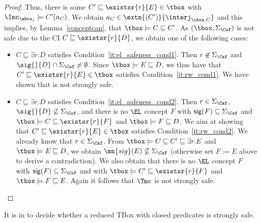 \documentclass{lmcs}
\theoremstyle{definition}
\begin{document}
\begin{proof}
Thus, there is some $C'\sqsubseteq \existsr{r}{E}\in\tbox$ with $\Imc_{\abox_j}\models C'(a_{C})$. 
We obtain $a_{C}\in\extn{(C')}{\interj_{\tbox,C}}$ and this implies, by Lemma~\ref{conceptcan},
that $\tbox\models C\sqsubseteq C'$. 
As $(\tbox,\Sigma_{\Csf})$ is not safe due to the CI
$C\sqsubseteq\existsr{r}{D}$, we obtain one of the following cases:
\begin{itemize}
\item $C \sqsubseteq \exists r . D$ satisfies
  Condition~\ref{it:el_safeness_cond1}.
  Then $r\not\in\Sigma_\Csf$ and $\sig{}{D}\cap\Sigma_\Csf\neq\emptyset$.  Since
  $\tbox\models E\sqsubseteq D$, we thus have that $C'\sqsubseteq
  \existsr{r}{E}\in\tbox$ satisfies Condition~\ref{it:rw_cond1}. We have shown that \Tmc is not strongly safe.

\item  $C \sqsubseteq \exists r . D$ satisfies
  Condition~\ref{it:el_safeness_cond2}.
  Then $r\in\Sigma_\Csf$, $\sig{}{D}\not\subseteq\Sigma_\Csf$, and there is no  $\EL$ concept $F$ with ${\sf sig}(F)\subseteq \Sigma_\Csf$ and
  $\tbox\models C\sqsubseteq\existsr{r}{F}$ and $\tbox\models F\sqsubseteq D$.
  We aim at showing that $C'\sqsubseteq \existsr{r}{E}\in\tbox$
  satisfies Condition~\ref{it:rw_cond2}.  We already know that $r \in
  \Sigma_\Csf$. From $\tbox\models C\sqsubseteq C' \sqsubseteq \exists
  r.E$ and $\tbox\models E\sqsubseteq D$, we obtain $\mn{sig}(E) \not\subseteq \Sigma_\Csf$ (otherwise set $F:=E$ above to derive a contradiction). 
  We also obtain that there is no $\EL$ concept $F$ with ${\sf sig}(F)\subseteq \Sigma_\Csf$ and with $\tbox\models
  C'\sqsubseteq\existsr{r}{F}$ and $\tbox\models F\sqsubseteq E$. Again it follows that $\Tmc$ is not strongly safe.
  \qedhere
  \end{itemize}
\end{proof}
%
\begin{lem}\label{lem:99}
It is in \ptime to decide whether a reduced \EL TBox with closed predicates is strongly safe.
\end{lem}
\end{document}
